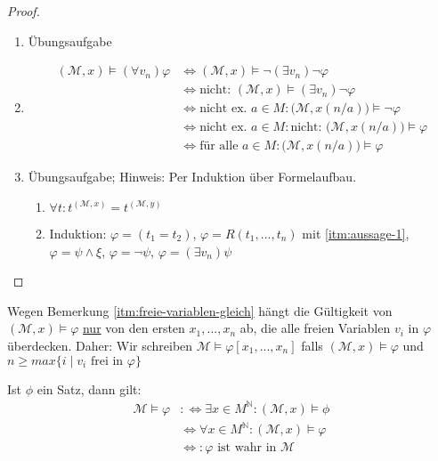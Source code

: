 \documentclass{article}
\theoremstyle{definition}
\theoremstyle{plain}
\newcommand{\calM}{\mathcal{M}}
\begin{document}
    \begin{proof}
        ~\par
        \begin{enumerate}
            \item Übungsaufgabe
            \item \begin{align*}
                (\calM, x) \models (\forall v_n) \varphi & \Leftrightarrow (\calM, x) \models \neg (\exists v_n) \neg \varphi \\
                & \Leftrightarrow \text{nicht: } (\calM, x) \models (\exists v_n) \neg \varphi \\
                & \Leftrightarrow \text{nicht ex. } a \in M: \big(\calM, x(n/a)\big) \models \neg \varphi \\
                & \Leftrightarrow \text{nicht ex. } a \in M: \text{nicht: } \big(\calM, x(n/a)\big) \models \varphi \\
                & \Leftrightarrow \text{für alle } a \in M: \big(\calM, x(n/a)\big) \models \varphi
            \end{align*}
            \item Übungsaufgabe; Hinweis: Per Induktion über Formelaufbau.
            \begin{enumerate}
                \item $ \forall t: t^{(\calM, x)} = t^{(\calM, y)} $ \label{itm:aussage-1}
                \item Induktion: $ \varphi = (t_1 = t_2) $, $ \varphi = R(t_1, ..., t_n) $ mit \ref{itm:aussage-1}, $ \varphi = \psi \land \xi $, $ \varphi = \neg \psi $, $ \varphi = (\exists v_n) \psi $
            \end{enumerate}
        \end{enumerate}
    \end{proof}

    Wegen Bemerkung \ref{itm:freie-variablen-gleich} hängt die Gültigkeit von $ (\calM, x) \models \varphi $ \underline{nur} von den ersten $ x_1, ..., x_n $ ab, die alle freien Variablen $ v_i $ in $ \varphi $ überdecken.
    Daher: Wir schreiben $ \calM \models \varphi[x_1, ..., x_n] $ falls $ (\calM, x) \models \varphi $ und $ n \geq max\{i \mid v_i \text{ frei in } \varphi\} $

    Ist $ \phi $ ein Satz, dann gilt:
    \begin{align*}
        \calM \models \varphi & :\Leftrightarrow \exists x \in M^{\mathbb{N}}: (\calM, x) \models \phi \\
        & \Leftrightarrow \forall x \in M^\mathbb{N}: (\calM, x) \models \varphi \\
        & \Leftrightarrow: \varphi \text{ ist wahr in } \calM
    \end{align*}
\end{document}

